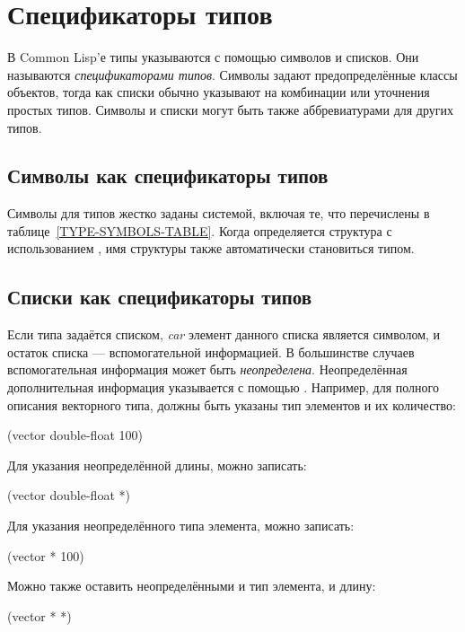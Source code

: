 \else %

\chapter{Спецификаторы типов}    %
\label{DTSPEC}

В Common Lisp'е типы указываются с помощью символов и списков. Они называются
\emph{спецификаторами типов}. Символы задают 
предопределённые классы объектов, тогда как списки обычно указывают на
комбинации или уточнения простых типов.
Символы и списки могут быть также аббревиатурами для других типов.

\section{Символы как спецификаторы типов}

Символы для типов жестко заданы системой, включая те, что перечислены в
таблице~\ref{TYPE-SYMBOLS-TABLE}.
Когда определяется структура с использованием , имя
структуры также автоматически становиться типом.

\section{Списки как спецификаторы типов}

Если типа задаётся списком, \emph{car} элемент данного списка является
символом, и остаток списка --- вспомогательной информацией. В большинстве случаев
вспомогательная информация может быть \emph{неопределена}. Неопределённая
дополнительная информация указывается с помощью \cd{*}. Например, для полного
описания векторного типа, должны быть указаны тип элементов и их количество:
\begin{lisp}
(vector double-float 100)
\end{lisp}

Для указания неопределённой длины, можно записать:
\begin{lisp}
(vector double-float *)
\end{lisp}

Для указания неопределённого типа элемента, можно записать:
\begin{lisp}
(vector * 100)
\end{lisp}

Можно также оставить неопределёнными и тип элемента, и длину:
\begin{lisp}
(vector * *)
\end{lisp}

